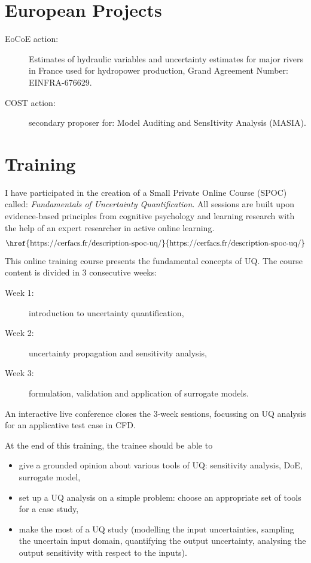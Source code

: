 \section*{European Projects}

\begin{description}
\item[EoCoE action:] Estimates of hydraulic variables and uncertainty estimates for major rivers in France used for hydropower production, Grand Agreement Number: EINFRA-676629.
\item[COST action:] secondary proposer for: Model Auditing and SensItivity Analysis (MASIA).
\end{description}


\section*{Training}

I have participated in the creation of a Small Private Online Course (SPOC) called: \emph{Fundamentals of Uncertainty Quantification}. All sessions are built upon evidence-based principles from cognitive psychology and learning research with the help of an expert researcher in active online learning.
\begin{align}
\text{\href{https://cerfacs.fr/description-spoc-uq/}{https://cerfacs.fr/description-spoc-uq/}}	\nonumber
\end{align}
\noindent This online training course presents the fundamental concepts of UQ. The course content is divided in 3 consecutive weeks:

\begin{description}
	\item[Week 1:] introduction to uncertainty quantification,
	\item[Week 2:] uncertainty propagation and sensitivity analysis,
	\item[Week 3:] formulation, validation and application of surrogate models.
\end{description}
 
\noindent An interactive live conference closes the 3-week sessions, focussing on UQ analysis for an applicative test case in CFD.

At the end of this training, the trainee should be able to

\begin{itemize}
	\item give a grounded opinion about various tools of UQ: sensitivity analysis, DoE, surrogate model,
	\item set up a UQ analysis on a simple problem: choose an appropriate set of tools for a case study,
	\item make the most of a UQ study (modelling the input uncertainties, sampling the uncertain input domain, quantifying the output uncertainty, analysing the output sensitivity with respect to the inputs).
\end{itemize}

